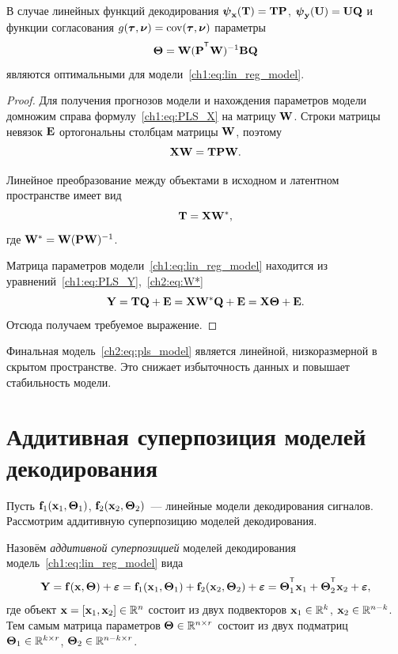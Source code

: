 \begin{theorem}
	В случае линейных функций декодирования $\boldsymbol{\psi}_{\mathbf{x}}(\mathbf{T}) = \mathbf{T} \mathbf{P}$, $\boldsymbol{\psi}_{\mathbf{y}} (\mathbf{U}) = \mathbf{U} \mathbf{Q}$ и функции согласования $g(\boldsymbol{\tau}, \boldsymbol{\nu}) = \textnormal{cov}(\boldsymbol{\tau}, \boldsymbol{\nu})$ параметры
	\[
		\bTheta = \bW (\bP^{\T} \bW)^{-1} \bB \bQ
	\]
	являются оптимальными для модели~\eqref{ch1:eq:lin_reg_model}.
\end{theorem}
\begin{proof}
	Для получения прогнозов модели и нахождения параметров модели 
	домножим справа формулу~\eqref{ch1:eq:PLS_X} на матрицу $\mathbf{W}$. Строки матрицы невязок $\mathbf{E}$ ортогональны столбцам матрицы $\mathbf{W}$, поэтому 
	\[
		\mathbf{X} \mathbf{W} = \mathbf{T} \mathbf{P} \mathbf{W}.
	\] 
	
	Линейное преобразование между объектами в исходном и латентном пространстве имеет вид
	\begin{equation}
		\mathbf{T} = \mathbf{X} \mathbf{W}^*,
		\label{ch2:eq:W*}
	\end{equation}
	где $\mathbf{W}^* = \mathbf{W} (\mathbf{P} \mathbf{W})^{-1}$. 
	
	Матрица параметров модели~\ref{ch1:eq:lin_reg_model} находится из уравнений~\eqref{ch1:eq:PLS_Y},~\eqref{ch2:eq:W*}
	\begin{equation}
		\mathbf{Y} = \mathbf{T} \mathbf{Q} + \mathbf{E} = \mathbf{X} \mathbf{W}^* \mathbf{Q} + \mathbf{E} = \mathbf{X} \boldsymbol{\Theta} + \mathbf{E}.
		\label{ch2:eq:pls_model}
	\end{equation}
	Отсюда получаем требуемое выражение.
\end{proof}
Финальная модель~\eqref{ch2:eq:pls_model} является линейной, низкоразмерной в скрытом пространстве. 
Это снижает избыточность данных и повышает стабильность модели.

\section{Аддитивная суперпозиция моделей декодирования}
\label{sec:ch2:superposition}

Пусть $\mathbf{f}_1(\mathbf{x}_1, \boldsymbol{\Theta}_1)$, $\mathbf{f}_2(\mathbf{x}_2, \boldsymbol{\Theta}_2)$~--- линейные модели декодирования сигналов. 
Рассмотрим аддитивную суперпозицию моделей декодирования.
\begin{definition}
	Назовём \textit{аддитивной суперпозицией} моделей декодирования модель~\eqref{ch1:eq:lin_reg_model} вида
	\begin{equation}
		\bY = \mathbf{f}(\bx, \bTheta) + \bepsilon = \mathbf{f}_1(\bx_1, \bTheta_1) + \mathbf{f}_2(\bx_2, \bTheta_2) + \bepsilon = \bTheta_1^{\T} \bx_1 + \bTheta_2^{\T} \bx_2 + \bepsilon,
		\label{ch2:eq:two_modal_reg_model}
	\end{equation}
	где объект $\mathbf{x} = [\mathbf{x}_1, \mathbf{x}_2] \in \mathbb{R}^n$ состоит из двух подвекторов $\mathbf{x}_1 \in \mathbb{R}^k$, $\mathbf{x}_2 \in \mathbb{R}^{n - k}$. 
	Тем самым матрица параметров $\boldsymbol{\Theta} \in \mathbb{R}^{n \times r}$ состоит из двух подматриц $\boldsymbol{\Theta}_1 \in \mathbb{R}^{k \times r}$, $\boldsymbol{\Theta}_2 \in \mathbb{R}^{n - k \times r}$. 
\end{definition}


